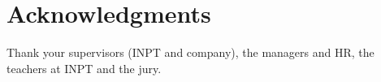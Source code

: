 \chapter*{Acknowledgments}


Thank your supervisors (INPT and company),
the managers and HR, the teachers at INPT and the jury. 